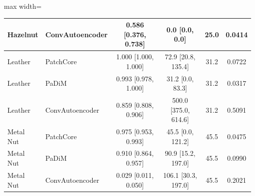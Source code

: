 \begin{table}[tbp]
\begin{adjustbox}{max width=\linewidth}
\begin{tabular}{llcccc}
Hazelnut & ConvAutoencoder & 0.586 [0.376, 0.738] & 0.0 [0.0, 0.0] & 25.0 & 0.0414 \\
\midrule
Leather & PatchCore & 1.000 [1.000, 1.000] & 72.9 [20.8, 135.4] & 31.2 & 0.0722 \\
Leather & PaDiM & 0.993 [0.978, 1.000] & 31.2 [0.0, 83.3] & 31.2 & 0.0317 \\
Leather & ConvAutoencoder & 0.859 [0.808, 0.906] & 500.0 [375.0, 614.6] & 31.2 & 0.5091 \\
\midrule
Metal Nut & PatchCore & 0.975 [0.953, 0.993] & 45.5 [0.0, 121.2] & 45.5 & 0.0475 \\
Metal Nut & PaDiM & 0.910 [0.864, 0.957] & 90.9 [15.2, 197.0] & 45.5 & 0.0990 \\
Metal Nut & ConvAutoencoder & 0.029 [0.011, 0.050] & 106.1 [30.3, 197.0] & 45.5 & 0.2021 \\
\bottomrule
\end{tabular}
\end{adjustbox}
\end{table}
